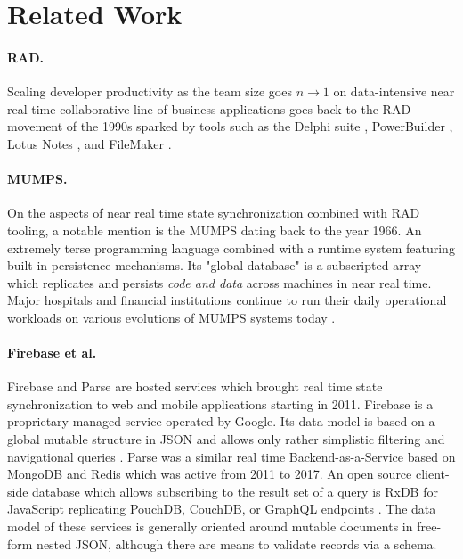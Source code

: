 \cleardoublepage
\section{Related Work}\label{sec:related_work}

\paragraph{\gls{RAD}.} Scaling developer productivity as the team size goes $n \to 1$ on data-intensive near real time collaborative line-of-business applications goes back to the \gls{RAD} movement of the 1990s sparked by tools such as the Delphi suite \cite{mackay2000reconfiguring}, PowerBuilder \cite{zubeck1997implementing}, Lotus Notes \cite{zubeck1997implementing}, and FileMaker
\cite{chen2010developing}.

\paragraph{MUMPS.} On the aspects of near real time state synchronization combined with RAD tooling, a notable mention is the \gls{MUMPS} \cite{bowie1979methods} dating back to the year 1966. An extremely terse programming language combined with a runtime system featuring built-in persistence mechanisms. Its "global database" is a subscripted array which replicates and persists \emph{code and data} across machines in near real time. Major hospitals and financial institutions continue to run their daily operational workloads on various evolutions of MUMPS systems today \cite{aller2018evolution}.

\paragraph{Firebase et al.} Firebase and Parse are hosted services which brought real time state synchronization to web and mobile applications starting in 2011. Firebase is a proprietary managed service operated by Google. Its data model is based on a global mutable structure in \gls{JSON} and allows only rather simplistic filtering and navigational queries \cite{wingerath2019real}. Parse was a similar real time Backend-as-a-Service based on MongoDB and Redis which was active from 2011 to 2017. An open source client-side database which allows subscribing to the result set of a query is RxDB for JavaScript replicating PouchDB, CouchDB, or GraphQL endpoints \cite{wingerath2019real}. The data model of these services is generally oriented around mutable documents in free-form nested \gls{JSON}, although there are means to validate records via a schema.



